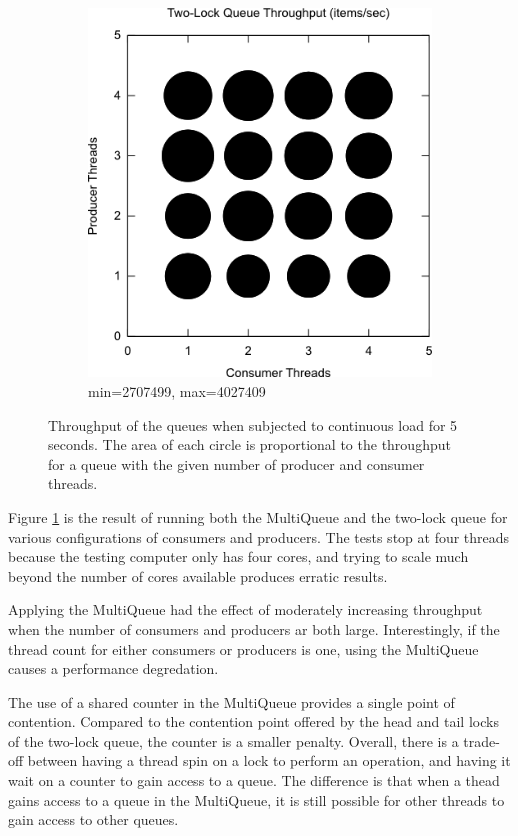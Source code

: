 \documentclass[12pt]{report}
\begin{document}
\begin{figure}[H]
\begin{subfigure}[b]{0.45\textwidth}
        \includegraphics[width=\textwidth]{two-lock.png}
        \caption{min=2707499, max=4027409}
    \end{subfigure}
    \caption{Throughput of the queues when subjected to continuous load for 5
    seconds. The area of each circle is proportional to the throughput for a
    queue with the given number of producer and consumer threads.}
    \label{smalltest}
\end{figure}

Figure \ref{smalltest} is the result of running both the MultiQueue and the
two-lock queue for various configurations of consumers and producers. The tests
stop at four threads because the testing computer only has four cores, and
trying to scale much beyond the number of cores available produces erratic
results.

Applying the MultiQueue had the effect of moderately increasing throughput when
the number of consumers and producers ar both large. Interestingly, if the
thread count for either consumers or producers is one, using the MultiQueue
causes a performance degredation.

The use of a shared counter in the MultiQueue provides a single point of
contention. Compared to the contention point offered by the head and tail locks
of the two-lock queue, the counter is a smaller penalty. Overall, there is a
trade-off between having a thread spin on a lock to perform an operation, and
having it wait on a counter to gain access to a queue. The difference is that
when a thead gains access to a queue in the MultiQueue, it is still possible
for other threads to gain access to other queues.
\end{document}
